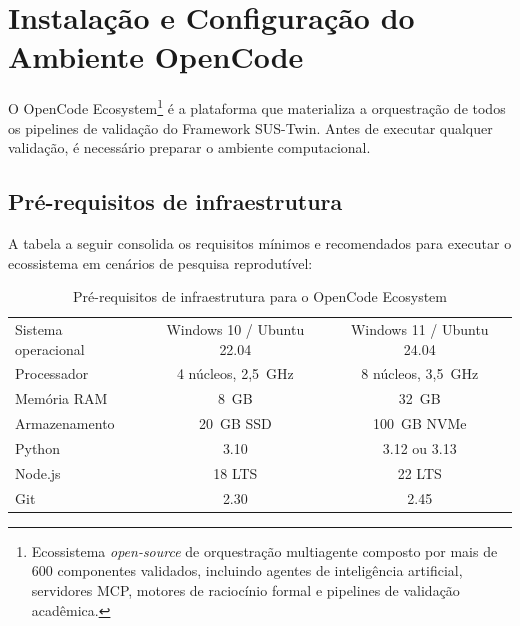 \label{ch:opencode}

\section{Instalação e Configuração do Ambiente OpenCode}
\label{sec:opencode-instalacao}

O OpenCode Ecosystem\footnote{Ecossistema \textit{open-source} de orquestração
multiagente composto por mais de 600 componentes validados, incluindo agentes
de inteligência artificial, servidores MCP, motores de raciocínio formal e
pipelines de validação acadêmica.} é a plataforma que materializa a
orquestração de todos os pipelines de validação do Framework SUS-Twin. Antes
de executar qualquer validação, é necessário preparar o ambiente computacional.

\subsection{Pré-requisitos de infraestrutura}

A tabela a seguir consolida os requisitos mínimos e recomendados para executar
o ecossistema em cenários de pesquisa reprodutível:

\begin{table}[ht]
\centering
\caption{Pré-requisitos de infraestrutura para o OpenCode Ecosystem}
\label{tab:opencode-requisitos}
\begin{tabular}{LCC}
\toprule
{} &  &  \\
\midrule
Sistema operacional & Windows 10 / Ubuntu 22.04 & Windows 11 / Ubuntu 24.04 \\
Processador & 4 núcleos, 2,5~GHz & 8 núcleos, 3,5~GHz \\
Memória RAM & 8~GB & 32~GB \\
Armazenamento & 20~GB SSD & 100~GB NVMe \\
Python & 3.10 & 3.12 ou 3.13 \\
Node.js & 18 LTS & 22 LTS \\
Git & 2.30 & 2.45 \\
\bottomrule
\end{tabular}
\end{table}

